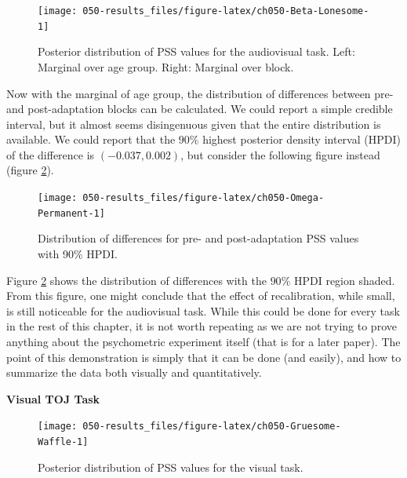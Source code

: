 \documentclass[11pt, oneside, openany]{scrbook}
\begin{document}
\begin{figure}

{\centering \texttt{[image: 050-results\_files/figure-latex/ch050-Beta-Lonesome-1]} 

}

\caption{Posterior distribution of PSS values for the audiovisual task. Left: Marginal over age group. Right: Marginal over block.}\label{fig:ch050-Beta-Lonesome}
\end{figure}

Now with the marginal of age group, the distribution of differences between pre- and post-adaptation blocks can be calculated. We could report a simple credible interval, but it almost seems disingenuous given that the entire distribution is available. We could report that the \(90\%\) highest posterior density interval (HPDI) of the difference is \((-0.037, 0.002)\), but consider the following figure instead (figure \ref{fig:ch050-Omega-Permanent}).

\begin{figure}

{\centering \texttt{[image: 050-results\_files/figure-latex/ch050-Omega-Permanent-1]} 

}

\caption{Distribution of differences for pre- and post-adaptation PSS values with 90\% HPDI.}\label{fig:ch050-Omega-Permanent}
\end{figure}

Figure \ref{fig:ch050-Omega-Permanent} shows the distribution of differences with the \(90\%\) HPDI region shaded. From this figure, one might conclude that the effect of recalibration, while small, is still noticeable for the audiovisual task. While this could be done for every task in the rest of this chapter, it is not worth repeating as we are not trying to prove anything about the psychometric experiment itself (that is for a later paper). The point of this demonstration is simply that it can be done (and easily), and how to summarize the data both visually and quantitatively.

\textbf{Visual TOJ Task}

\begin{figure}

{\centering \texttt{[image: 050-results\_files/figure-latex/ch050-Gruesome-Waffle-1]} 

}

\caption{Posterior distribution of PSS values for the visual task.}\label{fig:ch050-Gruesome-Waffle}
\end{figure}
\end{document}
